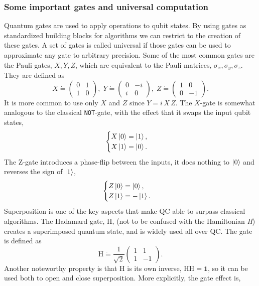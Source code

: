 \subsubsection{Some important gates and universal computation}
Quantum gates are used to apply operations to qubit states. By using gates as standardized building blocks for algorithms we can restrict to the creation of these gates. A set of gates is called universal if those gates can be used to approximate any gate to arbitrary precision. Some of the most common gates are the Pauli gates, $X, Y, Z$, which are equivalent to the Pauli matrices, $\sigma_x,\sigma_y,\sigma_z$. 
They are defined as
\begin{equation}
X \dot{=}\begin{pmatrix}
0 & 1 \\ 1 & 0
\end{pmatrix},\; 
Y\dot{=}\begin{pmatrix}
0 & -i \\ i & 0
\end{pmatrix},\; 
Z \dot{=} \begin{pmatrix}
1 & 0 \\ 0 & -1
\end{pmatrix}.
\end{equation}
It is more common to use only $X$ and $Z$ since $Y = i\,X\,Z$. The $X$-gate is somewhat analogous to the classical {\tt NOT}-gate,  
with the effect that it swaps the input qubit states, 
$$\begin{cases} X\ket{0} = \ket{1},\\
X\ket{1} = \ket{0}.
\end{cases}$$
The Z-gate introduces a phase-flip between the inputs, it does nothing to $\ket{0}$ and reverses the sign of $\ket{1}$, $$\begin{cases} Z\ket{0} = \ket{0},\\
Z\ket{1} = -\ket{1}.
\end{cases}$$ 
Superposition is one of the key aspects that make QC able to surpass classical algorithms. The Hadamard gate, H, (not to be confused with the Hamiltonian \textit{H}) creates a superimposed quantum state, and is widely used all over QC. The gate is defined as
\begin{equation}
\text{H} \dot{=} \dfrac{1}{\sqrt{2}}\begin{pmatrix}
1 & 1 \\ 1 & -1
\end{pmatrix}.
\end{equation}
Another noteworthy property is that H is its own inverse, $\text{HH} = \mathbf{1}$, so it can be used both to open and close superposition. More explicitly, the gate effect is,
